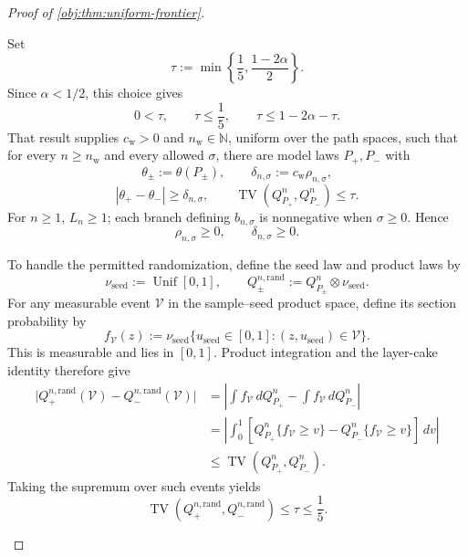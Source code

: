 \begin{proof}[Proof of \cref{obj:thm:uniform-frontier}]
\begin{enumerate}
Set
\[
\tau:=\min\left\{\frac15,\frac{1-2\alpha}{2}\right\}.
\]
Since \(\alpha<1/2\), this choice gives
\[
0<\tau,\qquad \tau\le\frac15,\qquad
\tau\le1-2\alpha-\tau.
\]
That result supplies \(c_{\mathrm w}>0\) and \(n_{\mathrm w}\in\mathbb N\), uniform over the path spaces, such that for every \(n\ge n_{\mathrm w}\) and every allowed \(\sigma\), there are model laws \(P_+,P_-\) with
\[
\theta_\pm:=\theta(P_\pm),\qquad
\delta_{n,\sigma}:=c_{\mathrm w}\rho_{n,\sigma},
\]
\[
|\theta_+-\theta_-|\ge\delta_{n,\sigma},
\qquad
\operatorname{TV}(Q_{P_+}^n,Q_{P_-}^n)\le\tau.
\]
For \(n\ge1\), \(L_n\ge1\); each branch defining \(b_{n,\sigma}\) is nonnegative when \(\sigma\ge0\). Hence
\[
\rho_{n,\sigma}\ge0,\qquad \delta_{n,\sigma}\ge0.
\]

To handle the permitted randomization, define the seed law and product laws by
\[
\nu_{\mathrm{seed}}:=\operatorname{Unif}[0,1],
\qquad
Q_\pm^{n,\mathrm{rand}}:=Q_{P_\pm}^n\otimes\nu_{\mathrm{seed}}.
\]
For any measurable event \(\mathcal V\) in the sample--seed product space, define its section probability by
\[
f_{\mathcal V}(z)
:=
\nu_{\mathrm{seed}}\{u_{\mathrm{seed}}\in[0,1]:
(z,u_{\mathrm{seed}})\in\mathcal V\}.
\]
This is measurable and lies in \([0,1]\). Product integration and the layer-cake identity therefore give
\[
\begin{aligned}
\bigl|Q_+^{n,\mathrm{rand}}(\mathcal V)
      -Q_-^{n,\mathrm{rand}}(\mathcal V)\bigr|
&=
\left|\int f_{\mathcal V}\,dQ_{P_+}^n
      -\int f_{\mathcal V}\,dQ_{P_-}^n\right|\\
&=
\left|\int_0^1
\left[
Q_{P_+}^n\{f_{\mathcal V}\ge v\}
-
Q_{P_-}^n\{f_{\mathcal V}\ge v\}
\right]\,dv\right|\\
&\le \operatorname{TV}(Q_{P_+}^n,Q_{P_-}^n).
\end{aligned}
\]
Taking the supremum over such events yields
\[
\operatorname{TV}(Q_+^{n,\mathrm{rand}},Q_-^{n,\mathrm{rand}})
\le\tau\le\frac15.
\]


\end{enumerate}
\end{proof}
